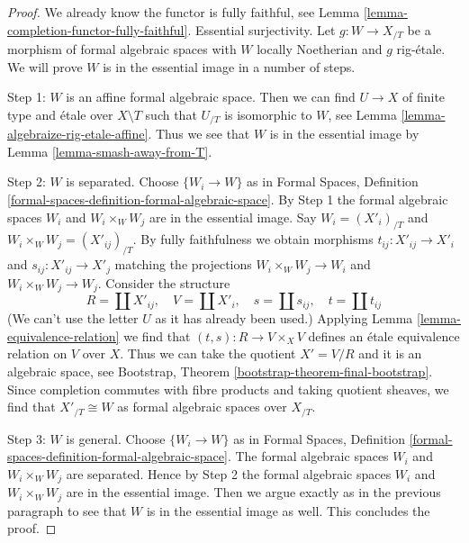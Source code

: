 \documentclass[10pt,a4paper]{amsart}
\theoremstyle{plain}
\theoremstyle{definition}
\theoremstyle{remark}
\numberwithin{equation}{subsection}
\begin{document}
\begin{proof}
We already know the functor is fully faithful, see
Lemma \ref{lemma-completion-functor-fully-faithful}.
Essential surjectivity. Let $g : W \to X_{/T}$ be a morphism
of formal algebraic spaces with $W$ locally Noetherian
and $g$ rig-\'etale. We will prove $W$ is in the essential
image in a number of steps.

\medskip\noindent
Step 1: $W$ is an affine formal algebraic space. Then we can find
$U \to X$ of finite type and \'etale over $X \setminus T$ such that
$U_{/T}$ is isomorphic to $W$, see
Lemma \ref{lemma-algebraize-rig-etale-affine}.
Thus we see that $W$ is in the essential image by
Lemma \ref{lemma-smash-away-from-T}.

\medskip\noindent
Step 2: $W$ is separated. Choose $\{W_i \to W\}$ as in
Formal Spaces, Definition \ref{formal-spaces-definition-formal-algebraic-space}.
By Step 1 the formal algebraic spaces $W_i$ and $W_i \times_W W_j$
are in the essential image.
Say $W_i = (X'_i)_{/T}$ and $W_i \times_W W_j = (X'_{ij})_{/T}$.
By fully faithfulness we obtain morphisms $t_{ij} : X'_{ij} \to X'_i$
and $s_{ij} : X'_{ij} \to X'_j$ matching the projections
$W_i \times_W W_j \to W_i$ and $W_i \times_W W_j \to W_j$.
Consider the structure
$$
R = \coprod X'_{ij},\quad
V = \coprod X'_i,\quad
s = \coprod s_{ij},\quad
t = \coprod t_{ij}
$$
(We can't use the letter $U$ as it has already been used.)
Applying Lemma \ref{lemma-equivalence-relation} we find that
$(t, s) : R \to V \times_X V$ defines an \'etale equivalence relation
on $V$ over $X$. Thus we can take the quotient $X' = V/R$ and
it is an algebraic space, see
Bootstrap, Theorem \ref{bootstrap-theorem-final-bootstrap}.
Since completion commutes with fibre products and taking
quotient sheaves, we find that
$X'_{/T} \cong W$ as formal algebraic spaces over $X_{/T}$.

\medskip\noindent
Step 3: $W$ is general. Choose $\{W_i \to W\}$ as in
Formal Spaces, Definition \ref{formal-spaces-definition-formal-algebraic-space}.
The formal algebraic spaces $W_i$ and $W_i \times_W W_j$ are separated.
Hence by Step 2  the formal algebraic spaces $W_i$ and $W_i \times_W W_j$
are in the essential image. Then we argue exactly as in the previous
paragraph to see that $W$ is in the essential image as well.
This concludes the proof.
\end{proof}
\end{document}
